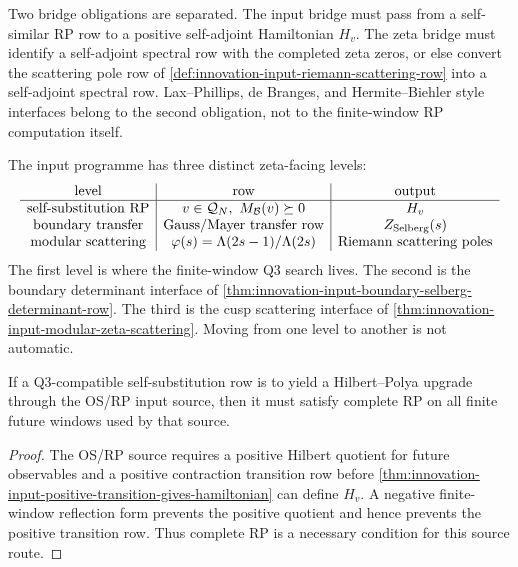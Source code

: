 \begin{principle}
\label{prin:innovation-input-two-hp-bridge-obligations}
Two bridge obligations are separated. The input bridge must pass from a
self-similar RP row to a positive self-adjoint Hamiltonian $H_v$. The zeta
bridge must identify a self-adjoint spectral row with the completed zeta
zeros, or else convert the scattering pole row of
\autoref{def:innovation-input-riemann-scattering-row} into a
self-adjoint spectral row. Lax--Phillips, de Branges, and
Hermite--Biehler style interfaces belong to the second obligation, not to
the finite-window RP computation itself.
\end{principle}

\begin{principle}
\label{prin:innovation-input-three-level-zeta-interface}
The input programme has three distinct zeta-facing levels:
$$
\begin{array}{c|c|c}
\text{level} & \text{row} & \text{output}\\
\hline
\text{self-substitution RP} & v\in\mathcal Q_N,\ M_{\mathcal B}(v)\succeq0
& H_v\\
\text{boundary transfer} & \text{Gauss/Mayer transfer row}
& Z_{\rm Selberg}(s)\\
\text{modular scattering} & \varphi(s)=\Lambda(2s-1)/\Lambda(2s)
& \text{Riemann scattering poles}
\end{array}
$$
The first level is where the finite-window Q3 search lives. The second is
the boundary determinant interface of
\autoref{thm:innovation-input-boundary-selberg-determinant-row}. The
third is the cusp scattering interface of
\autoref{thm:innovation-input-modular-zeta-scattering}. Moving from one
level to another is not automatic.
\end{principle}

\begin{theorem}
\label{thm:innovation-input-complete-rp-necessary-for-os-source-upgrade}
If a Q3-compatible self-substitution row is to yield a Hilbert--Polya
upgrade through the OS/RP input source, then it must satisfy complete RP
on all finite future windows used by that source.
\end{theorem}

\begin{proof}
The OS/RP source requires a positive Hilbert quotient for future
observables and a positive contraction transition row before
\autoref{thm:innovation-input-positive-transition-gives-hamiltonian} can
define $H_v$. A negative finite-window reflection form prevents the
positive quotient and hence prevents the positive transition row. Thus
complete RP is a necessary condition for this source route.
\end{proof}

